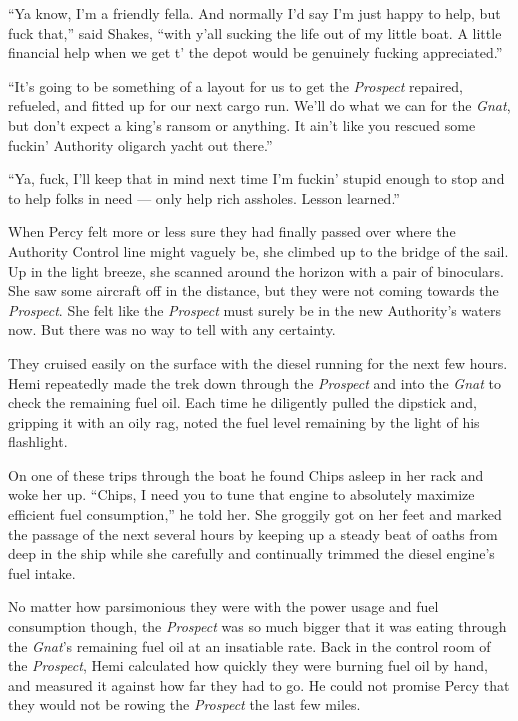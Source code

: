 \documentclass[
]{scrbook}
\begin{document}
``Ya know, I'm a friendly fella. And normally I'd say I'm just happy to
help, but fuck that,'' said Shakes, ``with y'all sucking the life out of
my little boat. A little financial help when we get t' the depot would
be genuinely fucking appreciated.''

``It's going to be something of a layout for us to get the
\emph{Prospect} repaired, refueled, and fitted up for our next cargo
run. We'll do what we can for the \emph{Gnat}, but don't expect a king's
ransom or anything. It ain't like you rescued some fuckin' Authority
oligarch yacht out there.''

``Ya, fuck, I'll keep that in mind next time I'm fuckin' stupid enough
to stop and to help folks in need --- only help rich assholes. Lesson
learned.''

\bigskip

When Percy felt more or less sure they had finally passed over where the
Authority Control line might vaguely be, she climbed up to the bridge of
the sail. Up in the light breeze, she scanned around the horizon with a
pair of binoculars. She saw some aircraft off in the distance, but they
were not coming towards the \emph{Prospect}. She felt like the
\emph{Prospect} must surely be in the new Authority's waters now. But
there was no way to tell with any certainty.

They cruised easily on the surface with the diesel running for the next
few hours. Hemi repeatedly made the trek down through the
\emph{Prospect} and into the \emph{Gnat} to check the remaining fuel
oil. Each time he diligently pulled the dipstick and, gripping it with
an oily rag, noted the fuel level remaining by the light of his
flashlight.

On one of these trips through the boat he found Chips asleep in her rack
and woke her up. ``Chips, I need you to tune that engine to absolutely
maximize efficient fuel consumption,'' he told her. She groggily got on
her feet and marked the passage of the next several hours by keeping up
a steady beat of oaths from deep in the ship while she carefully and
continually trimmed the diesel engine's fuel intake.

No matter how parsimonious they were with the power usage and fuel
consumption though, the \emph{Prospect} was so much bigger that it was
eating through the \emph{Gnat}'s remaining fuel oil at an insatiable
rate. Back in the control room of the \emph{Prospect}, Hemi calculated
how quickly they were burning fuel oil by hand, and measured it against
how far they had to go. He could not promise Percy that they would not
be rowing the \emph{Prospect} the last few miles.
\end{document}
